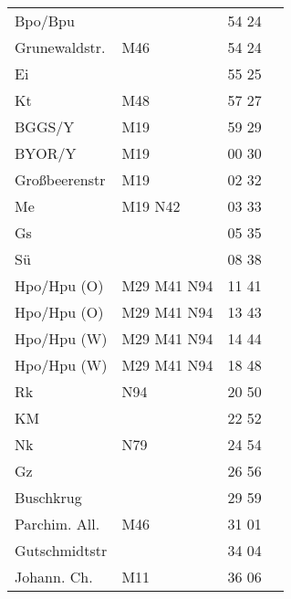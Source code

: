 \begin{tabular}{!{\color{schiefergrau}\vrule width 3pt}*{4}{l!{\color{schiefergrau}\vrule width 3pt}}}
Bpo/Bpu      &                                             & 54 24 &       \\
Grunewaldstr.& \mbus{} M46                                 & 54 24 &       \\
Ei           &                                             & 55 25 &       \\
Kt           & \mbus{} M48                                 & 57 27 &       \\
BGGS/Y       & \mbus{} M19                                 & 59 29 &       \\
BYOR/Y       & \mbus{} M19                                 & 00 30 &       \\
Großbeerenstr& \mbus{} M19                                 & 02 32 &       \\
Me           & \nusechs{} \mbus{} M19 \nbus{} N42          & 03 33 &       \\
Gs           &                                             & 05 35 &       \\
Sü           &                                             & 08 38 &       \\
Hpo/Hpu (O)  & \nuacht{} \mbus{} M29 M41 \nbus{} N94       & 11 41 &       \\
\hline
Hpo/Hpu (O)  & \nuacht{} \mbus{} M29 M41 \nbus{} N94       & 13 43 &       \\
Hpo/Hpu (W)  & \nuacht{} \mbus{} M29 M41 \nbus{} N94       & 14 44 &       \\
\hline
Hpo/Hpu (W)  & \nuacht{} \mbus{} M29 M41 \nbus{} N94       & 18 48 &       \\
Rk           & \nbus{} N94                                 & 20 50 &       \\
KM           &                                             & 22 52 &       \\
Nk           & \nbus{} N79                                 & 24 54 &       \\
Gz           &                                             & 26 56 &       \\
Buschkrug    &                                             & 29 59 &       \\
Parchim. All.& \mbus{} M46                                 & 31 01 &       \\
Gutschmidtstr&                                             & 34 04 &       \\
Johann. Ch.  & \mbus{} M11                                 & 36 06 &       \\

\end{tabular}
